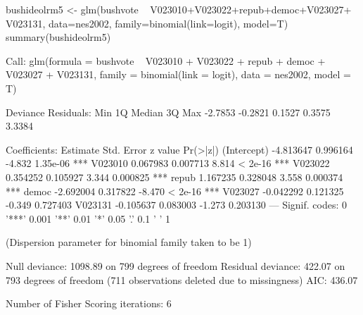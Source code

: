 \begin{Schunk}
\begin{Sinput}
 bushideolrm5 <- glm(bushvote ~ V023010+V023022+repub+democ+V023027+ V023131, data=nes2002, family=binomial(link=logit), model=T)
 summary(bushideolrm5)
\end{Sinput}
\begin{Soutput}
Call:
glm(formula = bushvote ~ V023010 + V023022 + repub + democ + 
    V023027 + V023131, family = binomial(link = logit), data = nes2002, 
    model = T)

Deviance Residuals: 
    Min       1Q   Median       3Q      Max  
-2.7853  -0.2821   0.1527   0.3575   3.3384  

Coefficients:
             Estimate Std. Error z value Pr(>|z|)    
(Intercept) -4.813647   0.996164  -4.832 1.35e-06 ***
V023010      0.067983   0.007713   8.814  < 2e-16 ***
V023022      0.354252   0.105927   3.344 0.000825 ***
repub        1.167235   0.328048   3.558 0.000374 ***
democ       -2.692004   0.317822  -8.470  < 2e-16 ***
V023027     -0.042292   0.121325  -0.349 0.727403    
V023131     -0.105637   0.083003  -1.273 0.203130    
---
Signif. codes:  0 '***' 0.001 '**' 0.01 '*' 0.05 '.' 0.1 ' ' 1

(Dispersion parameter for binomial family taken to be 1)

    Null deviance: 1098.89  on 799  degrees of freedom
Residual deviance:  422.07  on 793  degrees of freedom
  (711 observations deleted due to missingness)
AIC: 436.07

Number of Fisher Scoring iterations: 6
\end{Soutput}
\end{Schunk}
